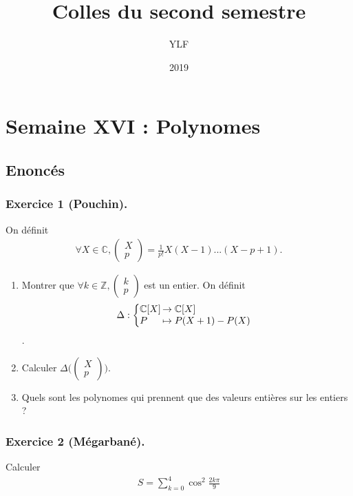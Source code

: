 \documentclass{article}
\begin{document}
\title{Colles du second semestre}
\author{YLF}
\date{2019}
\maketitle

\section{Semaine XVI : Polynomes}
\subsection*{Enoncés}
\subsubsection*{Exercice 1 (Pouchin).}
On définit \begin{align*}
\forall X\in\mathbb{C}, \begin{pmatrix}X\\p\end{pmatrix} = \frac{1}{p!}X(X-1)...(X-p+1).
\end{align*}
\begin{enumerate}
\item Montrer que $\forall k \in \mathbb{Z}, \begin{pmatrix}k\\p \end{pmatrix}$ est un entier.
On définit
\begin{align*}
  \Delta : \left\{
     \begin{array}{@{}l@{\thinspace}l}
      \mathbb{C}[X]&\to \mathbb{C}[X]\\
      P &\mapsto P(X+1)-P(X)
     \end{array}
   \right.   
\end{align*}.
\item Calculer $\Delta\bigg(\begin{pmatrix}X\\p\end{pmatrix}\bigg)$.
\item Quels sont les polynomes qui prennent que des valeurs entières sur les entiers ?
\end{enumerate}
\subsubsection*{Exercice 2 (Mégarbané).}
Calculer \begin{align*}
S = \sum_{k=0}^{4}{\cos^2{\frac{2k\pi}{9}}}
\end{align*}
\end{document}
